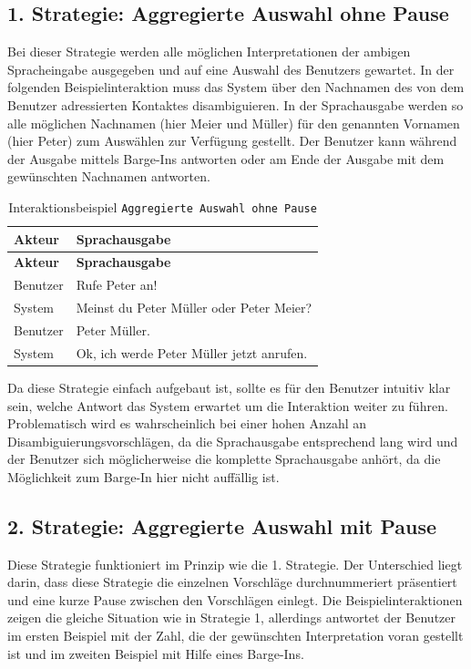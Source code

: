 \documentclass[12pt,a4paper]{scrartcl}
\begin{document}
\subsection{1. Strategie: Aggregierte Auswahl ohne Pause}
Bei dieser Strategie werden alle möglichen Interpretationen der ambigen Spracheingabe ausgegeben und auf eine Auswahl des Benutzers gewartet. In der folgenden  Beispielinteraktion muss das System über den Nachnamen des von dem Benutzer adressierten Kontaktes disambiguieren. In der Sprachausgabe werden so alle möglichen Nachnamen (hier Meier und Müller) für den genannten Vornamen (hier Peter) zum Auswählen zur Verfügung gestellt. Der Benutzer kann während der Ausgabe mittels Barge-Ins antworten oder am Ende der Ausgabe mit dem gewünschten Nachnamen antworten. 


\begin{longtable}{p{6cm}p{8cm}}
	\caption[Interaktionsbeispiel \texttt{Aggregierte Auswahl ohne Pause}]{Interaktionsbeispiel \texttt{Aggregierte Auswahl ohne Pause}}\\
	\hline
	\textbf{Akteur} &	\textbf{Sprachausgabe}\\
	\hline
	\endfirsthead
	\hline
	\textbf{Akteur} &	\textbf{Sprachausgabe}\\
	\hline
	\endhead
Benutzer & Rufe Peter an!\\
System & Meinst du Peter Müller oder Peter Meier?\\
Benutzer & Peter Müller.\\
System & Ok, ich werde Peter Müller jetzt anrufen.\\

\hline
\end{longtable}
	

Da diese Strategie einfach aufgebaut ist, sollte es für den Benutzer intuitiv klar sein, welche Antwort das System erwartet um die Interaktion weiter zu führen. Problematisch wird es wahrscheinlich bei einer hohen Anzahl an Disambiguierungsvorschlägen, da die Sprachausgabe entsprechend lang wird und der Benutzer sich möglicherweise die komplette Sprachausgabe anhört, da die Möglichkeit zum Barge-In hier nicht auffällig ist. 
  

\subsection{2. Strategie: Aggregierte Auswahl mit Pause}
Diese Strategie funktioniert im Prinzip wie die 1. Strategie. Der Unterschied liegt darin, dass diese Strategie die einzelnen Vorschläge durchnummeriert präsentiert und eine kurze Pause zwischen den Vorschlägen einlegt. Die Beispielinteraktionen zeigen die gleiche Situation wie in Strategie 1, allerdings antwortet der Benutzer im ersten Beispiel mit der Zahl, die der gewünschten Interpretation voran gestellt ist und im zweiten Beispiel mit Hilfe eines Barge-Ins.\\
\end{document}
